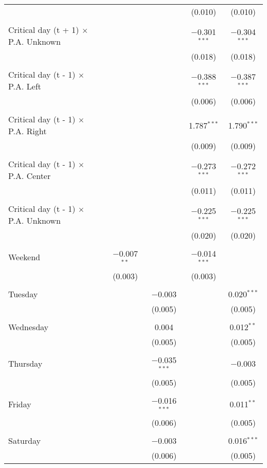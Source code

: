 \documentclass[
]{article}
\begin{document}
\begin{table}[!htbp]
{\begin{tabular}{@{\extracolsep{5pt}}lcccc}
  &  &  & (0.010) & (0.010) \\ 
  & & & & \\ 
 Critical day (t + 1) $\times$ P.A. Unknown &  &  & $-$0.301$^{***}$ & $-$0.304$^{***}$ \\ 
  &  &  & (0.018) & (0.018) \\ 
  & & & & \\ 
 Critical day (t - 1) $\times$ P.A. Left &  &  & $-$0.388$^{***}$ & $-$0.387$^{***}$ \\ 
  &  &  & (0.006) & (0.006) \\ 
  & & & & \\ 
 Critical day (t - 1) $\times$ P.A. Right &  &  & 1.787$^{***}$ & 1.790$^{***}$ \\ 
  &  &  & (0.009) & (0.009) \\ 
  & & & & \\ 
 Critical day (t - 1) $\times$ P.A. Center &  &  & $-$0.273$^{***}$ & $-$0.272$^{***}$ \\ 
  &  &  & (0.011) & (0.011) \\ 
  & & & & \\ 
 Critical day (t - 1) $\times$ P.A. Unknown &  &  & $-$0.225$^{***}$ & $-$0.225$^{***}$ \\ 
  &  &  & (0.020) & (0.020) \\ 
  & & & & \\ 
 Weekend & $-$0.007$^{**}$ &  & $-$0.014$^{***}$ &  \\ 
  & (0.003) &  & (0.003) &  \\ 
  & & & & \\ 
 Tuesday &  & $-$0.003 &  & 0.020$^{***}$ \\ 
  &  & (0.005) &  & (0.005) \\ 
  & & & & \\ 
 Wednesday &  & 0.004 &  & 0.012$^{**}$ \\ 
  &  & (0.005) &  & (0.005) \\ 
  & & & & \\ 
 Thursday &  & $-$0.035$^{***}$ &  & $-$0.003 \\ 
  &  & (0.005) &  & (0.005) \\ 
  & & & & \\ 
 Friday &  & $-$0.016$^{***}$ &  & 0.011$^{**}$ \\ 
  &  & (0.006) &  & (0.005) \\ 
  & & & & \\ 
 Saturday &  & $-$0.003 &  & 0.016$^{***}$ \\ 
  &  & (0.006) &  & (0.005) \\ 

\end{tabular}}
\end{table}
\end{document}
